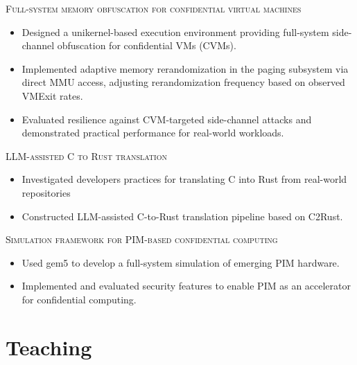 \documentclass[a4paper,11pt]{article}
\begin{document}
\textsc{Full-system memory obfuscation for confidential virtual machines}~\cite{incognitos}
\begin{itemize}[nosep,after=\strut, leftmargin=2em, itemsep=3pt]
	\item Designed a unikernel-based execution environment providing full-system side-channel obfuscation for confidential VMs (CVMs).
	\item Implemented adaptive memory rerandomization in the paging subsystem via direct MMU access, adjusting rerandomization frequency based on observed VMExit rates.
	\item Evaluated resilience against CVM-targeted side-channel attacks and demonstrated practical performance for real-world workloads.
\end{itemize}\vspace{6pt}

\textsc{LLM-assisted C to Rust translation}
\begin{itemize}[nosep,after=\strut, leftmargin=2em, itemsep=3pt]
	\item Investigated developers practices for translating C into Rust from real-world repositories
	\item Constructed LLM-assisted C-to-Rust translation pipeline based on C2Rust.
\end{itemize}\vspace{6pt}

\textsc{Simulation framework for PIM-based confidential computing}~\cite{pimoram}
\begin{itemize}[nosep,after=\strut, leftmargin=2em, itemsep=3pt]
	\item Used gem5 to develop a full-system simulation of emerging PIM hardware.
	\item Implemented and evaluated security features to enable PIM as an accelerator for confidential computing.
\end{itemize}\vspace{6pt}


\section{Teaching}
\end{document}
